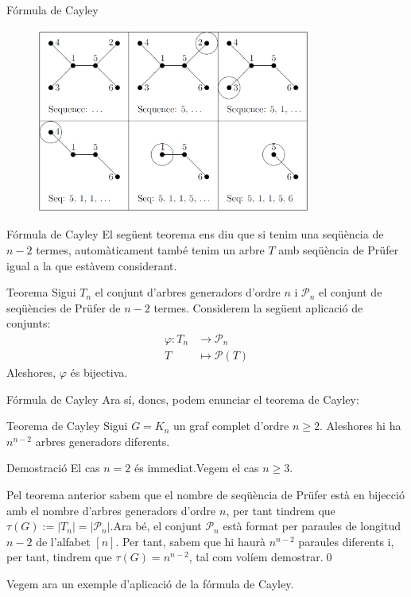 \documentclass{beamer}
\begin{document}
\begin{frame}{Fórmula de Cayley}
    \begin{figure}[ht]
        \centering
        \includegraphics[width=9cm]{Imatges/prufer1.jpg}
    \end{figure}
\end{frame}
\begin{frame}{Fórmula de Cayley}
    El següent teorema ens diu que si tenim una seqüència de $n-2$ termes, automàticament també tenim un arbre $T$ amb seqüència de Prüfer igual a la que estàvem considerant.\pause
    \begin{alertblock}{Teorema}
        Sigui $T_n$ el conjunt d'arbres generadors d'ordre $n$ i $\mathcal{P}_n$ el conjunt de seqüències de Prüfer de $n-2$ termes. Considerem la següent aplicació de conjunts:
        \begin{align*}
            \varphi:T_n & \rightarrow \mathcal{P}_n \\
            T           & \mapsto \mathcal{P}(T)
        \end{align*}\pause
        Aleshores, $\varphi$ és bijectiva.
    \end{alertblock}
\end{frame}
\begin{frame}{Fórmula de Cayley}
    Ara sí, doncs, podem enunciar el teorema de Cayley:\pause
    \begin{alertblock}{Teorema de Cayley}
        Sigui $G=K_n$ un graf complet d'ordre $n\geq 2$. Aleshores hi ha $n^{n-2}$ arbres generadors diferents.
    \end{alertblock}\pause
    \begin{block}{Demostració}
        El cas $n=2$ és immediat.\pause\space Vegem el cas $n\geq3$.\par
        Pel teorema anterior sabem que el nombre de seqüència de Prüfer està en bijecció amb el nombre d'arbres generadors d'ordre $n$, per tant tindrem que $\tau(G):=|T_n|=|\mathcal{P}_n|$.\pause\space Ara bé, el conjunt $\mathcal{P}_n$ està format per paraules de longitud $n-2$ de l'alfabet $[n]$. Per tant, sabem que hi haurà $n^{n-2}$ paraules diferents i, per tant, tindrem que $\tau(G)=n^{n-2}$, tal com volíem demostrar.\qed
    \end{block}\pause
    Vegem ara un exemple d'aplicació de la fórmula de Cayley.
\end{frame}
\end{document}

